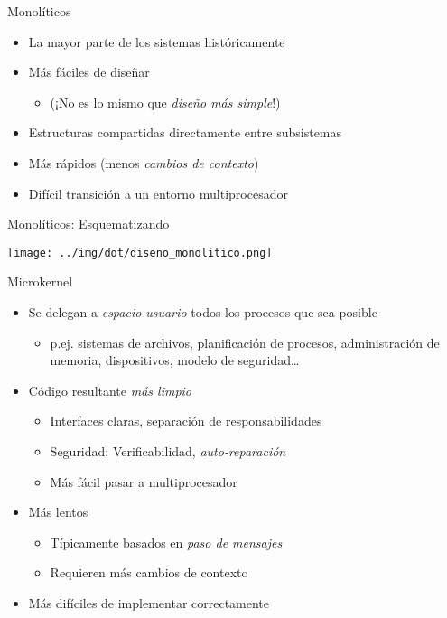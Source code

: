 \documentclass[presentation]{beamer}
\begin{document}
\begin{frame}[label={sec:orge89badb}]{Monolíticos}
\begin{itemize}
\item La mayor parte de los sistemas históricamente

\item Más fáciles de diseñar
\begin{itemize}
\item (¡No es lo mismo que \emph{diseño más simple}!)
\end{itemize}

\item Estructuras compartidas directamente entre subsistemas

\item Más rápidos (menos \emph{cambios de contexto})

\item Difícil transición a un entorno multiprocesador
\end{itemize}
\end{frame}

\begin{frame}[label={sec:org44b5574}]{Monolíticos: Esquematizando}
\begin{center}
\texttt{[image: ../img/dot/diseno\_monolitico.png]}
\end{center}
\end{frame}

\begin{frame}[label={sec:org16f7bd6}]{Microkernel}
\begin{itemize}
\item Se delegan a \emph{espacio usuario} todos los procesos que sea posible
\begin{itemize}
\item p.ej. sistemas de archivos, planificación de procesos,
administración de memoria, dispositivos, modelo de seguridad…
\end{itemize}

\item Código resultante \emph{más limpio}
\begin{itemize}
\item Interfaces claras, separación de responsabilidades
\item Seguridad: Verificabilidad, \emph{auto-reparación}
\item Más fácil pasar a multiprocesador
\end{itemize}

\item Más lentos
\begin{itemize}
\item Típicamente basados en \emph{paso de mensajes}
\item Requieren más cambios de contexto
\end{itemize}

\item Más difíciles de implementar correctamente
\end{itemize}
\end{frame}
\end{document}
